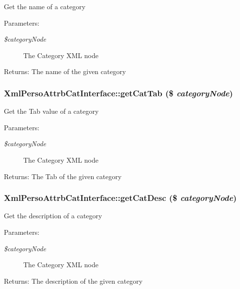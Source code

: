 Get the name of a category

\begin{Desc}
\item[Parameters:]
\begin{description}
\item[{\em \$categoryNode}]The Category XML node\end{description}
\end{Desc}
\begin{Desc}
\item[Returns:]The name of the given category \end{Desc}
\subsubsection{\setlength{\rightskip}{0pt plus 5cm}XmlPersoAttrbCatInterface::getCatTab (\$ {\em categoryNode})}\label{classXmlPersoAttrbCatInterface_ebde1c21a80b0ee7a50e04b96771d007}


Get the Tab value of a category

\begin{Desc}
\item[Parameters:]
\begin{description}
\item[{\em \$categoryNode}]The Category XML node\end{description}
\end{Desc}
\begin{Desc}
\item[Returns:]The Tab of the given category \end{Desc}
\subsubsection{\setlength{\rightskip}{0pt plus 5cm}XmlPersoAttrbCatInterface::getCatDesc (\$ {\em categoryNode})}\label{classXmlPersoAttrbCatInterface_a44eab3656a443d89ac748b05b2447e3}


Get the description of a category

\begin{Desc}
\item[Parameters:]
\begin{description}
\item[{\em \$categoryNode}]The Category XML node\end{description}
\end{Desc}
\begin{Desc}
\item[Returns:]The description of the given category \end{Desc}

